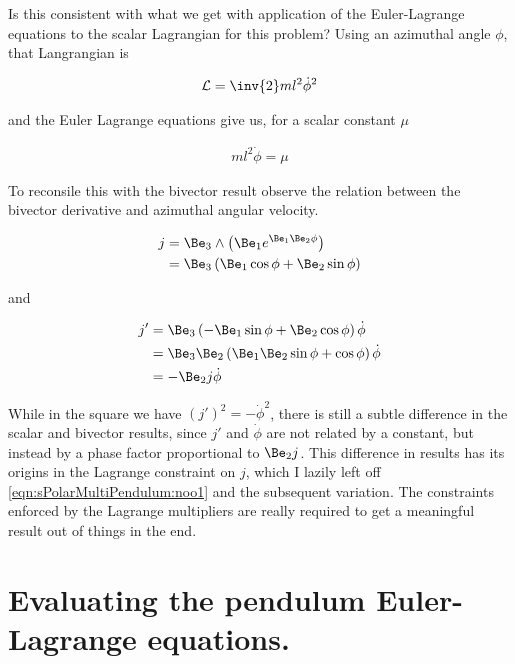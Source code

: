 Is this consistent with what we get with application of the Euler-Lagrange equations to the scalar Lagrangian for this problem?  Using an azimuthal angle $\phi$, that Langrangian is

\begin{align}\label{eqn:sPolarMultiPendulum:noo4}
\LL = \inv{2} m l^2 \dot{\phi}^2
\end{align}

and the Euler Lagrange equations give us, for a scalar constant $\mu$

\begin{align}\label{eqn:sPolarMultiPendulum:noo5}
m l^2 \dot{\phi} = \mu
\end{align}

To reconsile this with the bivector result observe the relation between the bivector derivative and azimuthal angular velocity.

\begin{align*}
j 
&= \Be_3 \wedge \left(\Be_1 e^{\Be_1 \Be_2 \phi} \right) \\
&= \Be_3 \left(\Be_1 \cos\phi + \Be_2 \sin\phi \right) \\
\end{align*}

and 

\begin{align*}
j'
&= \Be_3 \left(-\Be_1 \sin\phi + \Be_2 \cos\phi \right) \dot{\phi} \\
&= \Be_3 \Be_2 \left(\Be_1 \Be_2 \sin\phi + \cos\phi \right) \dot{\phi} \\
&= -\Be_2 j \dot{\phi} \\
\end{align*}

While in the square we have $(j')^2 = -\dot{\phi}^2$, there is still a subtle difference in the scalar and bivector results, since $j'$ and $\dot{\phi}$ are not related by a constant, but instead by a phase factor proportional to $\Be_2 j$.  This difference in results has its origins in the Lagrange constraint on $j$, which I lazily left off \ref{eqn:sPolarMultiPendulum:noo1} and the subsequent variation.  The constraints enforced by the Lagrange multipliers are really required to get a meaningful result out of things in the end.

\section{Evaluating the pendulum Euler-Lagrange equations.}

